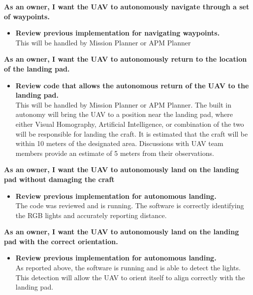 \vspace{3mm}
\noindent \large{\textbf{As an owner, I want the UAV to autonomously navigate through a set of waypoints.}}
\normalsize
\begin{itemize}
\item \textbf{Review previous implementation for navigating waypoints.}\\
This will be handled by Mission Planner or APM Planner
\end{itemize}

\vspace{3mm}
\noindent \large{\textbf{As an owner, I want the UAV to autonomously return to the location of the landing pad.}} 
\normalsize
\begin{itemize}
\item \textbf{Review code that allows the autonomous return of the UAV to the landing pad.}\\
 This will be handled by Mission Planner or APM Planner. The built in autonomy will bring the UAV to a position near the landing pad, where either Visual Homography, Artificial Intelligence, or combination of the two will be responsible for landing the craft. It is estimated that the craft will be within 10 meters of the designated area. Discussions with UAV team members provide an estimate of 5 meters from their observations.
\end{itemize}

\vspace{3mm}
\noindent \large{\textbf{As an owner, I want the UAV to autonomously land on the landing pad without damaging the craft}}
\normalsize
\begin{itemize}
\item \textbf{Review previous implementation for autonomous landing.}\\
 The code was reviewed and is running. The software is correctly identifying the RGB lights and accurately reporting distance.
\end{itemize}

\vspace{3mm}
\noindent \large{\textbf{As an owner, I want the UAV to autonomously land on the landing pad with the correct orientation.}}
\normalsize
\begin{itemize}
\item \textbf{Review previous implementation for autonomous landing.}\\
 As reported above, the software is running and is able to detect the lights. This detection will allow the UAV to orient itself to align correctly with the landing pad.
\end{itemize}

